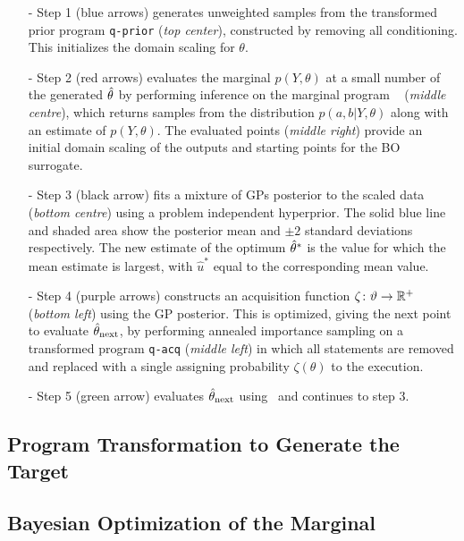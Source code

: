 \begin{itemize}
	\item[-] Step 1 (blue arrows) generates unweighted samples from the transformed prior program \texttt{q-prior} (\emph{top center}), constructed by removing all conditioning. This initializes the domain scaling for $\theta$.
	\item[-] Step 2 (red arrows) evaluates the marginal $p(Y,\theta)$ at a small number of the generated $\hat{\theta}$ by performing inference on the marginal program \qmarg~ (\emph{middle centre}), which returns samples from the distribution $p\left(a,b | Y, \theta\right)$ along with an estimate of $p(Y, \theta)$.  The evaluated points (\emph{middle right}) provide an initial domain scaling of the outputs and starting points for the BO surrogate.
	\item[-] Step 3 (black arrow) fits a mixture of GPs posterior \cite{rasmussen2006gaussian} to the scaled data (\emph{bottom centre}) using a problem independent hyperprior. The solid blue line and shaded area show the posterior mean and $\pm2$ standard deviations respectively. The new estimate of the optimum $\hat{\theta}^*$ is the value for which the mean estimate is largest, with $\hat{u}^*$ equal to the corresponding mean value.    
	\item[-] Step 4 (purple arrows) constructs an acquisition function $\zeta \colon \vartheta \rightarrow \mathbb{R}^+$ (\emph{bottom left}) using the GP posterior.  This is optimized, giving the next point to evaluate $\hat{\theta}_{\mathrm{next}}$, by performing annealed importance sampling on a transformed program \texttt{q-acq} (\emph{middle left}) in which all \observe statements are removed and replaced with a single \observe assigning probability $\zeta(\theta)$ to the execution. %
	\item[-] Step 5 (green arrow) evaluates $\hat{\theta}_{\mathrm{next}}$ using \qmarg~and continues to step 3.
\end{itemize}

\subsection{Program Transformation to Generate the Target}
\label{sec:transform}


%

\subsection{Bayesian Optimization of the Marginal}
\label{sec:BOPP}


\label{sec:bopp-for-ml}



